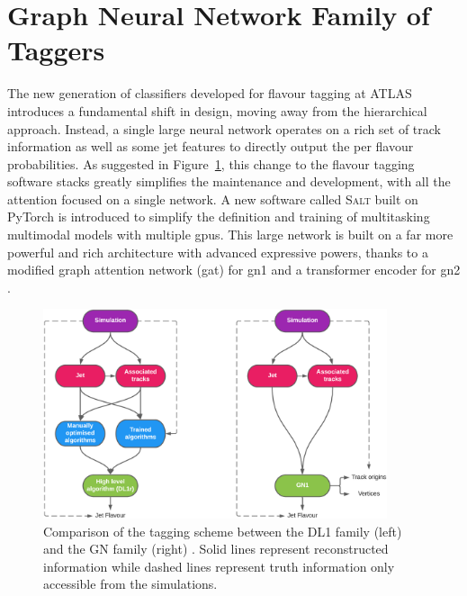 \section{Graph Neural Network Family of Taggers}\label{chap:GN}
The new generation of classifiers developed for flavour tagging at ATLAS introduces a fundamental shift in design, moving away from the hierarchical approach. Instead, a single large neural network operates on a rich set of track information as well as some jet features to directly output the per flavour probabilities. As suggested in Figure~\ref{fig:ftagArchi}, this change to the flavour tagging software stacks greatly simplifies the maintenance and development, with all the attention focused on a single network. A new software called \textsc{Salt} \cite{SaltCite} built on PyTorch \cite{pytorch} is introduced to simplify the definition and training of multitasking multimodal models with multiple \glspl{gpu}. This large network is built on a far more powerful and rich architecture with advanced expressive powers, thanks to a modified graph attention network (\gls{gat}) \cite{velickovic2018graph, brody2022how} for \gls{gn1} and a transformer encoder for \gls{gn2} \cite{NIPS_transformerPaper}. 

\begin{figure}[h!]
  \center
  \includegraphics[width=0.9\textwidth]{Images/FTAG/GN/Intro/schematics_difference.png}
  \caption{Comparison of the tagging scheme between the DL1 family (left) and the GN family (right) \cite{ATL-PHYS-PUB-2022-027}. Solid lines represent reconstructed information while dashed lines represent truth information only accessible from the simulations.} 
  \label{fig:ftagArchi}
\end{figure}

